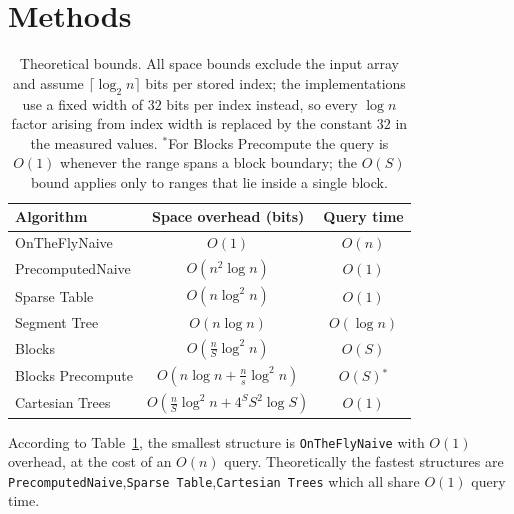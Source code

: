\documentclass[a4paper,UKenglish,cleveref,thm-restate]{lipics-v2021}
\begin{document}
\section{Methods}
\begin{table}[h]
	\centering
	\begin{tabular}{lcc}
		\hline
		Algorithm         & Space overhead (bits)                           & Query time                                                                           \\
		\hline
		OnTheFlyNaive     & $O(1)$                                          & $O(n)$                                                                               \\
		PrecomputedNaive  & $O(n^2 \log n)$                                 & $O(1)$                                                                               \\
		Sparse Table      & $O\!\left(n \log^2 n\right)$                    & $O(1)$                                                                               \\
		Segment Tree      & $O(n \log n)$                                   & $O(\log n)$                                                                          \\
		Blocks            & $O\!\left(\frac{n}{S}\log^2 n\right)$           & $O(S)$                                                                               \\
		Blocks Precompute & $O\!\left(n\log n + \frac{n}{s}\log^2 n\right)$ & $O(S)$$^{\ast}$ \\
			                                                                                    Cartesian Trees   & $O\!\left(\frac{n}{S}\log^2 n + 4^S S^2 \log S\right)$ & $O(1)$ \\
		\hline
	\end{tabular}
	\caption{Theoretical bounds. All space bounds exclude the input array and
		assume $\lceil \log_2 n \rceil$ bits per stored index; the implementations
		use a fixed width of $32$ bits per index instead, so every $\log n$ factor
		arising from index width is replaced by the constant $32$ in the measured
		values. $^{\ast}$For Blocks Precompute the query is $O(1)$ whenever the
		range spans a block boundary; the $O(S)$ bound applies only to ranges that
		lie inside a single block.}
	\label{tab:theoretical-bounds}
\end{table}

According to Table~\ref{tab:theoretical-bounds}, the smallest structure is \texttt{OnTheFlyNaive} with $O(1)$ overhead, at the cost of an $O(n)$ query.
Theoretically the fastest structures are \texttt{PrecomputedNaive},\texttt{Sparse Table},\texttt{Cartesian Trees} which all share $O(1)$ query time.
\end{document}
